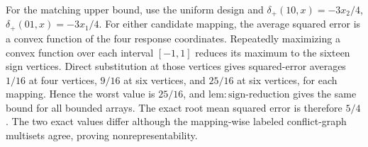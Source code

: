 For the matching upper bound, use the uniform design and \(\delta_+(10,x)=-3x_2/4\), \(\delta_+(01,x)=-3x_1/4\).  For either candidate mapping, the average squared error is a convex function of the four response coordinates.  Repeatedly maximizing a convex function over each interval \([-1,1]\) reduces its maximum to the sixteen sign vertices.  Direct substitution at those vertices gives squared-error averages \(1/16\) at four vertices, \(9/16\) at six vertices, and \(25/16\) at six vertices, for each mapping.  Hence the worst value is \(25/16\), and \(\mathrm{lem{:}sign\text{-}reduction}\) gives the same bound for all bounded arrays.  The exact root mean squared error is therefore \(5/4\).  The two exact values differ although the mapping-wise labeled conflict-graph multisets agree, proving nonrepresentability.